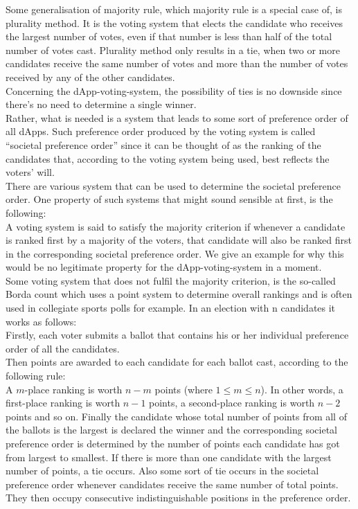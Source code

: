 Some generalisation of majority rule, which majority rule is a special case of, is plurality method. It is the voting system that elects the candidate who receives the largest number of votes, even if that number is less than half of the total number of votes cast. Plurality method only results in a tie, when two or more candidates receive the same number of votes and more than the number of votes received by any of the other candidates. \\
Concerning the dApp-voting-system, the possibility of ties is no downside since there's no need to determine a single winner.\\ %
Rather, what is needed is a system that leads to some sort of preference order of all dApps. Such preference order produced by the voting system is called ``societal preference order'' since it can be thought of as the ranking of the candidates that, according to the voting system being used, best reflects the voters' will. \\
There are various system that can be used to determine the societal preference order. One property of such systems that might sound sensible at first, is the following: \\
A voting system is said to satisfy the majority criterion if whenever a candidate is ranked first by a majority of the voters, that candidate will also be ranked first in the corresponding societal preference order. We give an example for why this would be no legitimate property for the dApp-voting-system in a moment.\\
Some voting system that does not fulfil the majority criterion, is the so-called Borda count which uses a point system to determine overall rankings and is often used in collegiate sports polls for example. In an election with n candidates it works as follows: \\
Firstly, each voter submits a ballot that contains his or her individual preference order of all the candidates. \\
Then points are awarded to each candidate for each ballot cast, according to the following rule: \\
A $m$-place ranking is worth $n-m$ points (where $1\leq m \leq n$). In other words, a first-place ranking is worth $n-1$ points, a second-place ranking is worth $n-2$ points and so on. 
Finally the candidate whose total number of points from all of the ballots is the largest is declared the winner and the corresponding societal preference order is determined by the number of points each candidate has got from largest to smallest. If there is more than one candidate with the largest number of points, a tie occurs. Also some sort of tie occurs in the societal preference order whenever candidates receive the same number of total points. They then occupy consecutive indistinguishable positions in the preference order. \\
